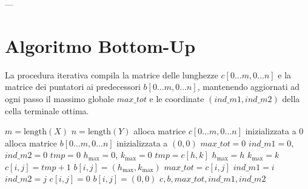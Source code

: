 ---

\section{Algoritmo Bottom-Up}

La procedura iterativa compila la matrice delle lunghezze $c[0 \dots m, 0 \dots n]$ e la matrice dei puntatori ai predecessori $b[0 \dots m, 0 \dots n]$, mantenendo aggiornati ad ogni passo il massimo globale $\mathit{max\_tot}$ e le coordinate $(\mathit{ind\_m1}, \mathit{ind\_m2})$ della cella terminale ottima.

\begin{algorithm}[H]
\caption{Calcolo della tabella LDCS e dei predecessori}
\label{alg:ldcs-bottom-up}
\begin{algorithmic}[1]
    \State $m = \text{length}(X)$ 
    \State $n = \text{length}(Y)$ 
    \State alloca matrice $c[0 \dots m, 0 \dots n]$ inizializzata a $0$
    \State alloca matrice $b[0 \dots m, 0 \dots n]$ inizializzata a $(0, 0)$
    \State $\mathit{max\_tot} = 0$ 
    \State $\mathit{ind\_m1} = 0$, $\mathit{ind\_m2} = 0$ 
             
                \State $\mathit{tmp} = 0$ 
                \State $h_{\max} = 0$, $k_{\max} = 0$ 
                            \State $\mathit{tmp} = c[h, k]$ 
                            \State $h_{\max} = h$
                            \State $k_{\max} = k$
                        \EndIf
                    \EndFor
                \EndFor
                \State $c[i, j] = \mathit{tmp} + 1$ 
                \State $b[i, j] = (h_{\max}, k_{\max})$ 
                 
                    \State $\mathit{max\_tot} = c[i, j]$
                    \State $\mathit{ind\_m1} = i$
                    \State $\mathit{ind\_m2} = j$
                \EndIf
            \Else
                \State $c[i, j] = 0$ 
                \State $b[i, j] = (0, 0)$
            \EndIf
        \EndFor
    \EndFor
    \State \Return $c, b, \mathit{max\_tot}, \mathit{ind\_m1}, \mathit{ind\_m2}$
\EndProcedure
\end{algorithmic}
\end{algorithm}

